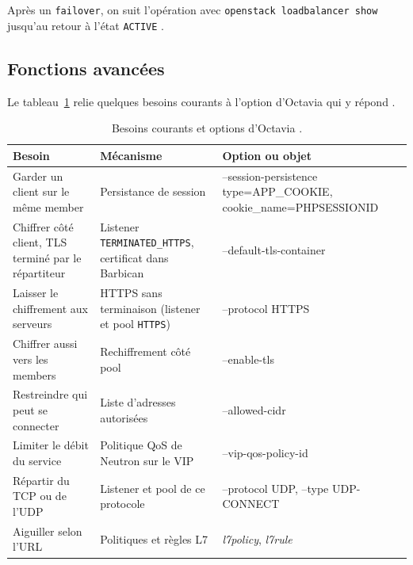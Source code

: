 Après un \texttt{failover}, on suit l'opération avec \texttt{openstack loadbalancer show} jusqu'au retour à l'état
\texttt{ACTIVE} \parencite{octavia-maintenance}.

\subsection{Fonctions avancées}\label{sec:oc-avance}

Le tableau~\ref{tab:oc-besoins} relie quelques besoins courants à l'option d'Octavia qui y répond \parencite{octavia-cookbook}.

\begin{table}[!ht]
\centering
\renewcommand{\arraystretch}{1.3}
\begin{tabular}{@{}>{\raggedright\arraybackslash}p{4.4cm}>{\raggedright\arraybackslash}p{4.9cm}>{\raggedright\arraybackslash\ttfamily\small}p{6.2cm}@{}}
\toprule
\textbf{Besoin} & \textbf{Mécanisme} & \textrm{\textbf{Option ou objet}} \\
\midrule
Garder un client sur le même member & Persistance de session & --session-persistence type=APP\_\allowbreak COOKIE, cookie\_\allowbreak name=PHPSESSIONID \\
Chiffrer côté client, TLS terminé par le répartiteur & Listener \texttt{TERMINATED\_\allowbreak HTTPS}, certificat dans Barbican & --default-tls-container \\
Laisser le chiffrement aux serveurs & HTTPS sans terminaison (listener et pool \texttt{HTTPS}) & --protocol HTTPS \\
Chiffrer aussi vers les members & Rechiffrement côté pool & --enable-tls \\
Restreindre qui peut se connecter & Liste d'adresses autorisées & --allowed-cidr \\
Limiter le débit du service & Politique QoS de Neutron sur le VIP & --vip-qos-policy-id \\
Répartir du TCP ou de l'UDP & Listener et pool de ce protocole & --protocol UDP, --type UDP-CONNECT \\
Aiguiller selon l'URL & Politiques et règles L7 & \textrm{\emph{l7policy}, \emph{l7rule}} \\
\bottomrule
\end{tabular}
\caption{Besoins courants et options d'Octavia \parencite{octavia-cookbook}.}
\label{tab:oc-besoins}
\end{table}

